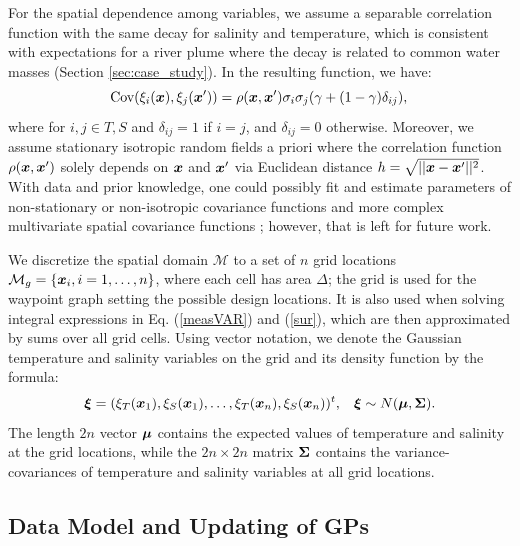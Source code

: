 \documentclass[aoas]{imsart}
\begin{document}
For the spatial dependence among variables, we assume a separable
correlation function with the same decay for salinity and temperature,
which is consistent with expectations for a river plume where the
decay is related to common water masses (Section
\ref{sec:case_study}). In the resulting function, we have:
\begin{equation}\label{gp_corr}
\mbox{Cov}(\xi_i(\bx),\xi_j(\bx')) = \rho(\bx,\bx') \sigma_i \sigma_j (\gamma +(1-\gamma )\delta_{ij}), \\
\end{equation}
where for $i,j \in {T,S}$ and $\delta_{ij}=1$ if $i=j$, and
$\delta_{ij}=0$ otherwise. Moreover, we assume stationary isotropic
random fields a priori where the correlation function $\rho({\boldsymbol x},{\boldsymbol x}')$
solely depends on ${\boldsymbol x}$ and ${\boldsymbol x}'$ via Euclidean distance
$h=\sqrt{||{\boldsymbol x}-{\boldsymbol x}'||^2}$. With data and prior knowledge, one could
possibly fit and estimate parameters of non-stationary or
non-isotropic covariance functions and more complex multivariate
spatial covariance functions
\citep{gneiting2010matern,genton2015cross}; however, that is left for
future work.

We discretize the spatial domain $\mathcal{M}$ to a set of $n$ grid
locations $\mathcal{M}_g = \{{\boldsymbol x}_i, i=1,\ldots,n \}$, where each cell
has area $\Delta$; the grid is used for the waypoint graph setting the
possible design locations. It is also used when solving integral
expressions in Eq. (\ref{measVAR}) and (\ref{sur}), which are then
approximated by sums over all grid cells.  Using vector notation, we
denote the Gaussian temperature and salinity variables on the grid and
its density function by the formula:
\begin{equation}\label{prior}
    \bxi = (\xi_T(\bx_1),\xi_S(\bx_1),\ldots,\xi_T(\bx_n),\xi_S(\bx_n))^t, \hspace{3mm}
    \bxi  \sim  N(\bmu, \bSigma). %
\end{equation}
The length $2 n$ vector ${\boldsymbol \mu}$ contains the expected values of
temperature and salinity at the grid locations, while the
$2n \times 2n$ matrix ${\boldsymbol \Sigma}$ contains the
variance-covariances of temperature and salinity variables at all grid
locations.

\subsection{Data Model and Updating of GPs}
\end{document}
